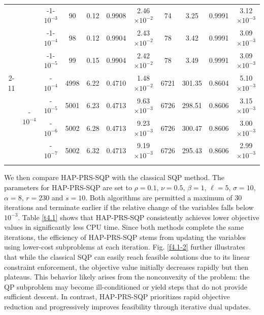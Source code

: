 \documentclass[pdflatex,sn-mathphys-num]{sn-jnl}%
\theoremstyle{thmstyleone}%
\theoremstyle{thmstyletwo}%
\theoremstyle{thmstylethree}%
\begin{document}
\begin{table}[]
{\begin{tabular}{ccccccccccc}
			\multicolumn{1}{c|}{} & \multicolumn{1}{c|}{} & \multicolumn{1}{c|}{-1-$10^{-3}$}& 90 & 0.12 & 0.9908 & \multicolumn{1}{c|}{2.46$\times 10^{-2}$} & 74 & 3.25 & 0.9991 & 3.12$\times 10^{-3}$\\
			\multicolumn{1}{c|}{} & \multicolumn{1}{c|}{} & \multicolumn{1}{c|}{-1-$10^{-4}$}& 98 & 0.12 & 0.9904 & \multicolumn{1}{c|}{2.43$\times 10^{-2}$} & 78 & 3.42 & 0.9991 & 3.09$\times 10^{-3}$\\
			\multicolumn{1}{c|}{} & \multicolumn{1}{c|}{} & \multicolumn{1}{c|}{-1-$10^{-5}$}& 99 & 0.15 & 0.9904 & \multicolumn{1}{c|}{2.42$\times 10^{-2}$} & 78 & 3.49 & 0.9991 & 3.09$\times 10^{-3}$\\ \cmidrule{2-11}
			\multicolumn{1}{c|}{} & \multicolumn{1}{c|}{\multirow{4}{*}{-$10^{-4}$}} & \multicolumn{1}{c|}{-$10^{-4}$} & 4998 & 6.22 & 0.4710 & \multicolumn{1}{c|}{1.48$\times 10^{-2}$} & 6721 & 301.35 & 0.8604 & 5.10$\times 10^{-3}$\\
			\multicolumn{1}{c|}{} & \multicolumn{1}{c|}{} & \multicolumn{1}{c|}{-$10^{-5}$} & 5001 & 6.23 & 0.4713 & \multicolumn{1}{c|}{9.63$\times 10^{-3}$}& 6726 & 298.51 & 0.8606 & 3.15$\times 10^{-3}$\\
			\multicolumn{1}{c|}{} & \multicolumn{1}{c|}{}& \multicolumn{1}{c|}{-$10^{-6}$} & 5002 & 6.28 & 0.4713 & \multicolumn{1}{c|}{9.23$\times 10^{-3}$} & 6726 & 300.47 & 0.8606 & 3.00$\times 10^{-3}$\\
			\multicolumn{1}{c|}{} & \multicolumn{1}{c|}{} & \multicolumn{1}{c|}{-$10^{-7}$}& 5002 & 6.32 & 0.4713 & \multicolumn{1}{c|}{9.19$\times 10^{-3}$} & 6726 & 295.43 & 0.8606 & 2.99$\times 10^{-3}$\\
			\botrule
		\end{tabular}
	}
\end{table}


	We then compare HAP-PRS-SQP with the classical SQP method. The parameters for HAP-PRS-SQP are set to $\rho=0.1$, $\nu=0.5$, $\beta=1$, $\ell=5$, $\sigma=10$, $\alpha=8$, $r=230$ and $s=10$. Both algorithms are permitted a maximum of 30 iterations and terminate earlier if the relative change of the variables falls below $10^{-3}$. 
	Table \ref{t4.1} shows that HAP-PRS-SQP consistently achieves lower objective values in significantly less CPU time. Since both methods complete the same iterations, the efficiency of HAP-PRS-SQP stems from updating the variables using lower-cost subproblems at each iteration.  
	Fig. \ref{f4.1-2} further illustrates that while the classical SQP can easily reach feasible solutions due to its linear constraint enforcement, the objective value initially decreases rapidly but then plateaus. This behavior likely arises from the nonconvexity of the problem: the QP subproblem may become ill-conditioned or yield steps that do not provide sufficient descent. In contrast, HAP-PRS-SQP prioritizes rapid objective reduction and progressively improves feasibility through iterative dual updates.
\end{document}
